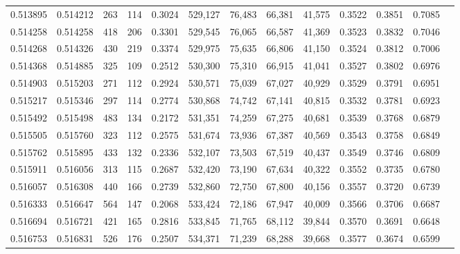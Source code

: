 \begin{tabular}{rrrrrrrrrrrrr}
0.513895 & 0.514212 &   263 &   114 &                                     0.3024 & 529,127 &  76,483 &  66,381 &  41,575 & 0.3522 & 0.3851 & 0.7085 \\
0.514258 & 0.514258 &   418 &   206 &                                     0.3301 & 529,545 &  76,065 &  66,587 &  41,369 & 0.3523 & 0.3832 & 0.7046 \\
0.514268 & 0.514326 &   430 &   219 &                                     0.3374 & 529,975 &  75,635 &  66,806 &  41,150 & 0.3524 & 0.3812 & 0.7006 \\
0.514368 & 0.514885 &   325 &   109 &                                     0.2512 & 530,300 &  75,310 &  66,915 &  41,041 & 0.3527 & 0.3802 & 0.6976 \\
0.514903 & 0.515203 &   271 &   112 &                                     0.2924 & 530,571 &  75,039 &  67,027 &  40,929 & 0.3529 & 0.3791 & 0.6951 \\
0.515217 & 0.515346 &   297 &   114 &                                     0.2774 & 530,868 &  74,742 &  67,141 &  40,815 & 0.3532 & 0.3781 & 0.6923 \\
0.515492 & 0.515498 &   483 &   134 &                                     0.2172 & 531,351 &  74,259 &  67,275 &  40,681 & 0.3539 & 0.3768 & 0.6879 \\
0.515505 & 0.515760 &   323 &   112 &                                     0.2575 & 531,674 &  73,936 &  67,387 &  40,569 & 0.3543 & 0.3758 & 0.6849 \\
0.515762 & 0.515895 &   433 &   132 &                                     0.2336 & 532,107 &  73,503 &  67,519 &  40,437 & 0.3549 & 0.3746 & 0.6809 \\
0.515911 & 0.516056 &   313 &   115 &                                     0.2687 & 532,420 &  73,190 &  67,634 &  40,322 & 0.3552 & 0.3735 & 0.6780 \\
0.516057 & 0.516308 &   440 &   166 &                                     0.2739 & 532,860 &  72,750 &  67,800 &  40,156 & 0.3557 & 0.3720 & 0.6739 \\
0.516333 & 0.516647 &   564 &   147 &                                     0.2068 & 533,424 &  72,186 &  67,947 &  40,009 & 0.3566 & 0.3706 & 0.6687 \\
0.516694 & 0.516721 &   421 &   165 &                                     0.2816 & 533,845 &  71,765 &  68,112 &  39,844 & 0.3570 & 0.3691 & 0.6648 \\
0.516753 & 0.516831 &   526 &   176 &                                     0.2507 & 534,371 &  71,239 &  68,288 &  39,668 & 0.3577 & 0.3674 & 0.6599 \\

\end{tabular}
